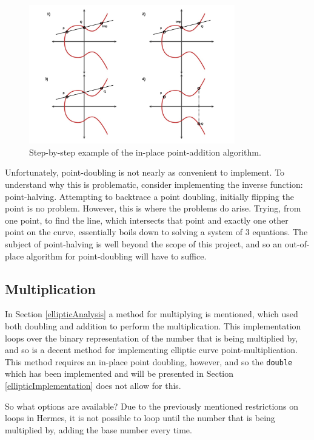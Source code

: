 \begin{figure}[H]
    \centering
    \includegraphics[width=0.8\textwidth]{figures/InPlaceAdd}
    \caption{Step-by-step example of the in-place point-addition algorithm.}
\end{figure}

Unfortunately, point-doubling is not nearly as convenient to implement. To understand why this is problematic, consider implementing the inverse function: point-halving. Attempting to backtrace a point doubling, initially flipping the point is no problem. However, this is where the problems do arise. Trying, from one point, to find the line, which intersects that point and exactly one other point on the curve, essentially boils down to solving a system of 3 equations\cite{Halving}. The subject of point-halving is well beyond the scope of this project, and so an out-of-place algorithm for point-doubling will have to suffice. 
\subsection{Multiplication}
In Section \ref{ellipticAnalysis} a method for multiplying is mentioned, which used both doubling and addition to perform the multiplication. This implementation loops over the binary representation of the number that is being multiplied by, and so is a decent method for implementing elliptic curve point-multiplication. This method requires an in-place point doubling, however, and so the \texttt{double} which has been implemented and will be presented in Section \ref{ellipticImplementation} does not allow for this.

So what options are available? Due to the previously mentioned restrictions on loops in Hermes, it is not possible to loop until the number that is being multiplied by, adding the base number every time.


